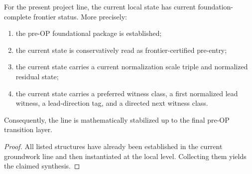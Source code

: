 \begin{theorem}\label{thm:current-state-synthesis-theorem}
For the present project line, the current local state has current foundation-complete frontier status. More precisely:
\begin{enumerate}[leftmargin=2em]
  \item the pre-OP foundational package is established;
  \item the current state is conservatively read as frontier-certified pre-entry;
  \item the current state carries a current normalization scale triple and normalized residual state;
  \item the current state carries a preferred witness class, a first normalized lead witness, a lead-direction tag, and a directed next witness class.
\end{enumerate}
Consequently, the line is mathematically stabilized up to the final pre-OP transition layer.
\end{theorem}

\begin{proof}
All listed structures have already been established in the current groundwork line and then instantiated at the local level. Collecting them yields the claimed synthesis.
\end{proof}

